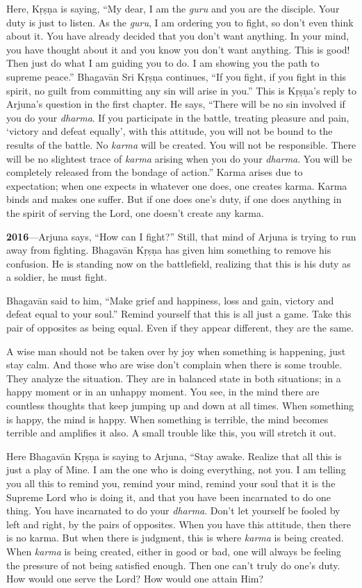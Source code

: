 Here, Kṛṣṇa is saying, “My dear, I am the \textit{guru} and you are the disciple. Your duty is just to listen. As the \textit{guru}, I am ordering you to fight, so don’t even think about it. You have already decided that you don’t want anything. In your mind, you have thought about it and you know you don’t want anything. This is good! Then just do what I am guiding you to do. I am showing you the path to supreme peace.” Bhagavān Sri Kṛṣṇa continues, “If you fight, if you fight in this spirit, no guilt from committing any sin will arise in you.” This is Kṛṣṇa’s reply to Arjuna’s question in the first chapter. He says, “There will be no sin involved if you do your \textit{dharma}. If you participate in the battle, treating pleasure and pain, ‘victory and defeat equally’, with this attitude, you will not be bound to the results of the battle. No \textit{karma} will be created. You will not be responsible. There will be no slightest trace of \textit{karma} arising when you do your \textit{dharma}. You will be completely released from the bondage of action.” Karma arises due to expectation; when one expects in whatever one does, one creates karma. Karma binds and makes one suffer. But if one does one’s duty, if one does anything in the spirit of serving the Lord, one doesn’t create any karma.

\textbf{2016}---Arjuna says, “How can I fight?” Still, that mind of Arjuna is trying to run away from fighting. Bhagavān Kṛṣṇa has given him something to remove his confusion. He is standing now on the battlefield, realizing that this is his duty as a soldier, he must fight.

Bhagavān said to him, “Make grief and happiness, loss and gain, victory and defeat equal to your soul.” Remind yourself that this is all just a game. Take this pair of opposites as being equal. Even if they appear different, they are the same.

A wise man should not be taken over by joy when something is happening, just stay calm. And those who are wise don’t complain when there is some trouble. They analyze the situation. They are in balanced state in both situations; in a happy moment or in an unhappy moment. You see, in the mind there are countless thoughts that keep jumping up and down at all times. When something is happy, the mind is happy. When something is terrible, the mind becomes terrible and amplifies it also. A small trouble like this, you will stretch it out.

Here Bhagavān Kṛṣṇa is saying to Arjuna, “Stay awake. Realize that all this is just a play of Mine. I am the one who is doing everything, not you. I am telling you all this to remind you, remind your mind, remind your soul that it is the Supreme Lord who is doing it, and that you have been incarnated to do one thing. You have incarnated to do your \textit{dharma}. Don’t let yourself be fooled by left and right, by the pairs of opposites. When you have this attitude, then there is no karma. But when there is judgment, this is where \textit{karma} is being created. When \textit{karma} is being created, either in good or bad, one will always be feeling the pressure of not being satisfied enough. Then one can’t truly do one’s duty. How would one serve the Lord? How would one attain Him?

